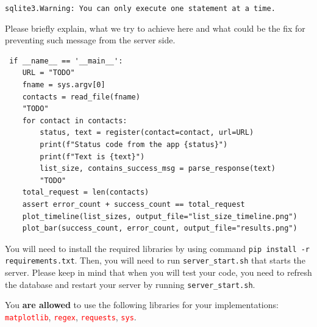 \documentclass{resources/WeSTassignment}
\begin{document}
\texttt{sqlite3.Warning: You can only execute one statement at a time.}

Please briefly explain, what we try to achieve here and what could be the fix for preventing such message from the server side.

 \begin{lstlisting}
 if __name__ == '__main__':
    URL = "TODO"
    fname = sys.argv[0]
    contacts = read_file(fname)
    "TODO"
    for contact in contacts:
        status, text = register(contact=contact, url=URL)
        print(f"Status code from the app {status}")
        print(f"Text is {text}")
        list_size, contains_success_msg = parse_response(text)
        "TODO"
    total_request = len(contacts)
    assert error_count + success_count == total_request
    plot_timeline(list_sizes, output_file="list_size_timeline.png")
    plot_bar(success_count, error_count, output_file="results.png")
 \end{lstlisting}

You will need to install the required libraries by using command \texttt{pip install -r requirements.txt}. Then, you will need to run \texttt{server\_start.sh} that starts the server. Please keep in mind that when you will test your code, you need to refresh the database and restart your server by running \texttt{server\_start.sh}. 

You \textbf{are allowed} to use the following libraries for your implementations: \textcolor{red}{\texttt{matplotlib}}, \textcolor{red}{\texttt{regex}}, \textcolor{red}{\texttt{requests}},
\textcolor{red}{\texttt{sys}}.
\end{document}
